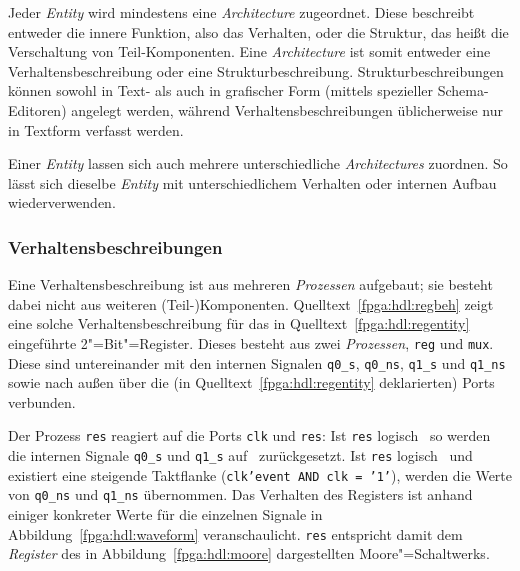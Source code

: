 Jeder \textit{Entity} wird mindestens eine \textit{Architecture} zugeordnet.
Diese beschreibt entweder die innere Funktion, also das Verhalten, oder die
Struktur, das heißt die Verschaltung von Teil-Komponenten. Eine
\textit{Architecture} ist somit entweder eine Verhaltensbeschreibung oder eine
Strukturbeschreibung. Strukturbeschreibungen können sowohl in Text- als auch
in grafischer Form (mittels spezieller Schema-Editoren) angelegt werden, während
Verhaltensbeschreibungen üblicherweise nur in Textform verfasst werden.
\cite[vgl.][27]{kesel2013}

Einer \textit{Entity} lassen sich auch mehrere unterschiedliche
\textit{Architectures} zuordnen. So lässt sich dieselbe \textit{Entity} mit
unterschiedlichem Verhalten oder internen Aufbau wiederverwenden.
\cite[vgl.][27]{kesel2013}

\subsubsection{Verhaltensbeschreibungen}

Eine Verhaltensbeschreibung ist aus mehreren \textit{Prozessen} aufgebaut; sie
besteht dabei nicht aus weiteren (Teil-)Komponenten.
Quelltext~\ref{fpga:hdl:regbeh} zeigt eine solche Verhaltensbeschreibung für
das in Quelltext~\ref{fpga:hdl:regentity} eingeführte 2"=Bit"=Register. Dieses
besteht aus zwei \textit{Prozessen}, \texttt{reg} und \texttt{mux}. Diese sind
untereinander mit den internen Signalen \texttt{q0\_s}, \texttt{q0\_ns},
\texttt{q1\_s} und \texttt{q1\_ns} sowie nach außen über die (in
Quelltext~\ref{fpga:hdl:regentity} deklarierten) Ports verbunden.
\cite[vgl.][29]{kesel2013}

Der Prozess \texttt{res} reagiert auf die Ports \texttt{clk} und \texttt{res}:
Ist \texttt{res} logisch \grqq\, so werden die internen Signale
\texttt{q0\_s} und \texttt{q1\_s} auf \grqq\ zurückgesetzt. Ist
\texttt{res} logisch \grqq\ und existiert eine steigende Taktflanke
(\texttt{clk'event AND clk = '1'}), werden die Werte von \texttt{q0\_ns} und
\texttt{q1\_ns} übernommen. Das Verhalten des Registers ist anhand einiger
konkreter Werte für die einzelnen Signale in Abbildung~\ref{fpga:hdl:waveform}
veranschaulicht. \texttt{res} entspricht damit dem \textit{Register} des in
Abbildung~\ref{fpga:hdl:moore} dargestellten Moore"=Schaltwerks.
\cite[vgl.][30--31]{kesel2013}

